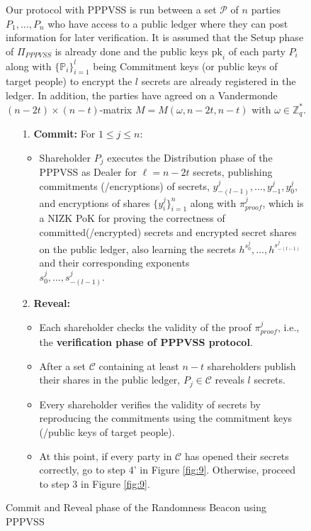 \begin{figure}[ht]
    \centering
    \begin{tcolorbox}[title=\textbf{Randomness Beacon using PPPVSS}, width=0.9\textwidth, colframe=blue!75!black, colback=blue!10, sharp corners]
        Our protocol with PPPVSS is run between a set $\mathcal{P}$ of $n$ 
        parties $P_1, \dots, P_n$ who have access to a public ledger where they 
        can post information for later verification. It is assumed that the 
        Setup phase of $\Pi_{PPPVSS}$ is already done and the public keys 
        $\text{pk}_i$ of each party $P_i$ along with $\{\mathbb{P}_i\}_{i=1}^{l}$ 
        being Commitment keys (or public keys of target people) to encrypt the 
        $l$ secrets are already registered in the ledger. In addition, the 
        parties have agreed on a Vandermonde $(n - 2t) \times (n - t)$-matrix 
        $M = M(\omega, n - 2t, n - t)$ with $\omega \in \mathbb{Z}_q^*$.

    \begin{enumerate}
        \item [1.]\textbf{Commit:} For $1 \leq j \leq n$:
        \begin{itemize}
            \item Shareholder $P_j$ executes the Distribution phase of the PPPVSS as Dealer for $\ell = n - 2t$ secrets, publishing commitments (/encryptions) of secrets, $y_{-(l-1)}^j, \dots, y_{-1}^j, y_0^j$, and encryptions of shares $\{y_i^j\}_{i=1}^n$ along with $\pi_{proof}^{j}$, which is a NIZK PoK for proving the correctness of committed(/encrypted) secrets and encrypted secret shares on the public ledger, also learning the secrets $h^{s_0^j},...,h^{s_{-(l-1)}^j}$ and their corresponding exponents\\ $s_0^j, \dots, s_{-(l-1)}^j$.
        \end{itemize}
        
        \item [2.]\textbf{Reveal:}
        \begin{itemize}
            \item Each shareholder checks the validity of the proof $\pi_{proof}^j$, i.e., the \textbf{verification phase of PPPVSS protocol}.
            \item After a set $\mathcal{C}$ containing at least $n-t$ shareholders publish their shares in the public ledger, $P_j\in\mathcal{C}$ reveals $l$ secrets.
            \item Every shareholder verifies the validity of secrets by reproducing the commitments using the commitment keys (/public keys of target people).
            \item At this point, if every party in $\mathcal{C}$ has opened their secrets correctly, go to step 4' in Figure \ref{fig:9}. Otherwise, proceed to step 3 in Figure \ref{fig:9}.
        \end{itemize}
    \end{enumerate}
    \end{tcolorbox}
    \caption{Commit and Reveal phase of the Randomness Beacon using PPPVSS}
    \label{fig:randomness_beacon}
\end{figure}